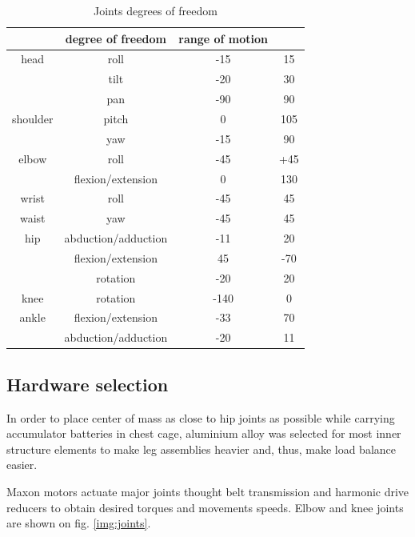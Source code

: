 \documentclass[letterpaper, 10 pt, conference]{ieeeconf}  %
\begin{document}
\begin{table}[thpb]
    \caption{Joints degrees of freedom}
    \label{tbl:DOFTable}
    \begin{center}
    \begin{tabular}{c | c c c}
        & degree of freedom & range of motion & \\
    \hline
        head & roll & -15 & 15 \\
            & tilt & -20 & 30 \\
            & pan & -90 & 90 \\
    \hline
        shoulder &  pitch & 0 & 105\\
                & yaw & -15 & 90\\
    \hline
        elbow & roll & -45 & +45 \\
                & flexion/extension & 0 & 130\\ 
    \hline
        wrist & roll & -45 & 45 \\
    \hline
        waist & yaw & -45 & 45 \\
    \hline
        hip & abduction/adduction & -11 & 20 \\
            & flexion/extension & 45 & -70 \\
            & rotation &-20 & 20\\
    \hline
        knee & rotation & -140 & 0 \\
    \hline
        ankle & flexion/extension & -33 & 70 \\
            & abduction/adduction & -20 & 11\\
    \end{tabular}
    \end{center}
\end{table}

\subsection{Hardware selection}
In order to place center of mass as close to hip joints as possible while
carrying accumulator batteries in chest cage, aluminium alloy was selected for
most inner structure elements to make leg assemblies heavier and, thus, make
load balance easier.

Maxon motors actuate major joints thought belt transmission and harmonic drive
reducers to obtain desired torques and movements speeds.
Elbow and knee joints are shown on fig.
\ref{img:joints}.
\end{document}
